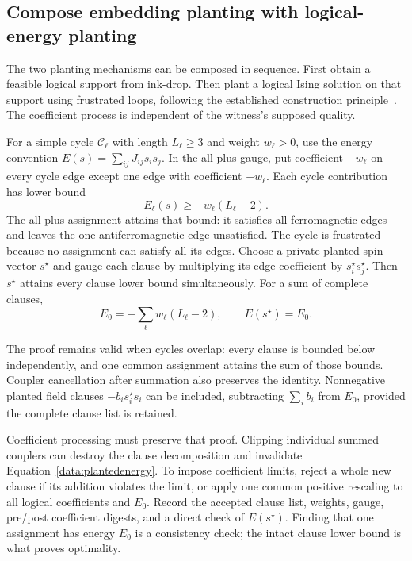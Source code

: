 \documentclass[11pt,a4paper]{article}
\theoremstyle{definition}\newtheorem{definition}[proposition]{Definition}
\begin{document}
\subsection{Compose embedding planting with logical-energy planting}
\label{data:frustrated}

The two planting mechanisms can be composed in sequence. First obtain a feasible logical support from ink-drop. Then plant a logical Ising solution on that support using frustrated loops, following the established construction principle~\cite{hen2015}. The coefficient process is independent of the witness's supposed quality.

For a simple cycle $\mathcal C_\ell$ with length $L_\ell\ge3$ and weight $w_\ell>0$, use the energy convention $E(s)=\sum_{ij}J_{ij}s_is_j$. In the all-plus gauge, put coefficient $-w_\ell$ on every cycle edge except one edge with coefficient $+w_\ell$. Each cycle contribution has lower bound
\[
 E_\ell(s)\ge-w_\ell(L_\ell-2).
\]
The all-plus assignment attains that bound: it satisfies all ferromagnetic edges and leaves the one antiferromagnetic edge unsatisfied. The cycle is frustrated because no assignment can satisfy all its edges. Choose a private planted spin vector $s^\star$ and gauge each clause by multiplying its edge coefficient by $s_i^\star s_j^\star$. Then $s^\star$ attains every clause lower bound simultaneously. For a sum of complete clauses,
\begin{equation}
 E_0=-\sum_\ell w_\ell(L_\ell-2),
 \qquad E(s^\star)=E_0.
 \label{data:plantedenergy}
\end{equation}

The proof remains valid when cycles overlap: every clause is bounded below independently, and one common assignment attains the sum of those bounds. Coupler cancellation after summation also preserves the identity. Nonnegative planted field clauses $-b_i s_i^\star s_i$ can be included, subtracting $\sum_i b_i$ from $E_0$, provided the complete clause list is retained.

Coefficient processing must preserve that proof. Clipping individual summed couplers can destroy the clause decomposition and invalidate Equation~\eqref{data:plantedenergy}. To impose coefficient limits, reject a whole new clause if its addition violates the limit, or apply one common positive rescaling to all logical coefficients and $E_0$. Record the accepted clause list, weights, gauge, pre/post coefficient digests, and a direct check of $E(s^\star)$. Finding that one assignment has energy $E_0$ is a consistency check; the intact clause lower bound is what proves optimality.
\end{document}
